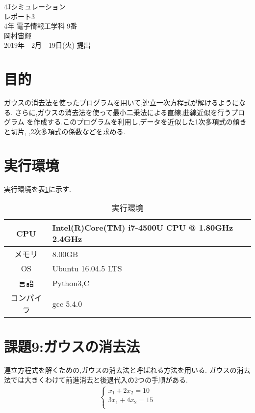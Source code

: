 \documentclass[a4j]{jsarticle}
\begin{document}
\begin{titlepage}
\begin{center}
\vspace*{230truept}
\huge{4Jシミュレーション}\\
\huge{レポート3}\\
\vspace*{30truept}
\Large{4年 電子情報工学科 9番 \\岡村宙輝}\\
\vspace*{50truept}
\Large{2019年　2月　19日(火) 提出}\\
\end{center}
\end{titlepage}


\section{目的}
ガウスの消去法を使ったプログラムを用いて,連立一次方程式が解けるようになる.
さらに,ガウスの消去法を使って最小二乗法による直線,曲線近似を行うプログラム
を作成する.このプログラムを利用し,データを近似した1次多項式の傾きと切片,
,2次多項式の係数などを求める.

\section{実行環境}
実行環境を表\ref{kan}に示す.

\begin{table}[htbp]
\begin{center}
\caption{実行環境}
\label{kan}
\begin{tabular}{|c|l|}
\hline
CPU&Intel(R)Core(TM) i7-4500U CPU @ 1.80GHz 2.4GHz \\
\hline
メモリ&8.00GB\\
\hline
OS&Ubuntu 16.04.5 LTS\\
\hline
言語&Python3,C\\
\hline
コンパイラ&gcc 5.4.0\\
\hline
\end{tabular}
\end{center}
\end{table}


\section{課題9:ガウスの消去法}
連立方程式を解くための,ガウスの消去法と呼ばれる方法を用いる.
ガウスの消去法では大きくわけて前進消去と後退代入の2つの手順がある\cite{sim}.
\begin{eqnarray}
\begin{cases}
x_1  + 2x_2 = 10\\
3x_1 + 4x_2  = 15\\
\end{cases}
\label{gaus}
\end{eqnarray}
\end{document}
